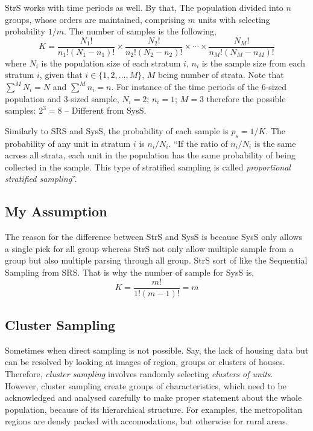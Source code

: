 StrS works with time periods as well. By that, The population divided into $n$ groups, whose orders are maintained, comprising $m$ units with selecting probability $1/m$. The number of samples is the following,
\begin{equation}
    K=\frac{N_1!}{n_1!(N_1-n_1)!}\times\frac{N_2!}{n_2!(N_2-n_2)!}\times\cdots\times\frac{N_M!}{n_M!(N_M-n_M)!}
\end{equation}
where $N_i$ is the population size of each stratum $i$, $n_i$ is the sample size from each stratum $i$, given that $i\in\{1,2,\ldots,M\}$, $M$ being number of strata. Note that $\sum^{M}N_i=N$ and 
$\sum^{M}n_i=n$. For instance of the time periods of the 6-sized population and 3-sized sample, $N_i=2$; $n_i=1$; $M=3$ therefore the possible samples: $2^3=8$ -- Different from SysS.

Similarly to SRS and SysS, the probability of each sample is $p_s=1/K$. The probability of any unit in stratum $i$ is $n_i/N_i$. ``If the ratio of $n_i/N_i$ is the same across all strata, each unit in the 
population has the same probability of being collected in the sample. This type of stratified sampling is called \emph{proportional stratified sampling}''.

\subsection{My Assumption}
The reason for the difference between StrS and SysS is because SysS only allows a single pick for all group whereas StrS not only allow multiple sample from a group but also multiple parsing through all group. StrS sort 
of like the Sequential Sampling from SRS. That is why the number of sample for SysS is,
\begin{equation}
    K=\frac{m!}{1!(m-1)!}=m
\end{equation}  

\subsection{Cluster Sampling}
Sometimes when direct sampling is not possible. Say, the lack of housing data but can be resolved by looking at images of region, groups or clusters of houses. Therefore, \emph{cluster sampling} involves randomly selecting
\emph{clusters of units}. However, cluster sampling create groups of characteristics, which need to be acknowledged and analysed carefully to make proper statement about the whole population, because of its 
hierarchical structure. For examples, the metropolitan regions are densly packed with accomodations, but otherwise for rural areas. 

